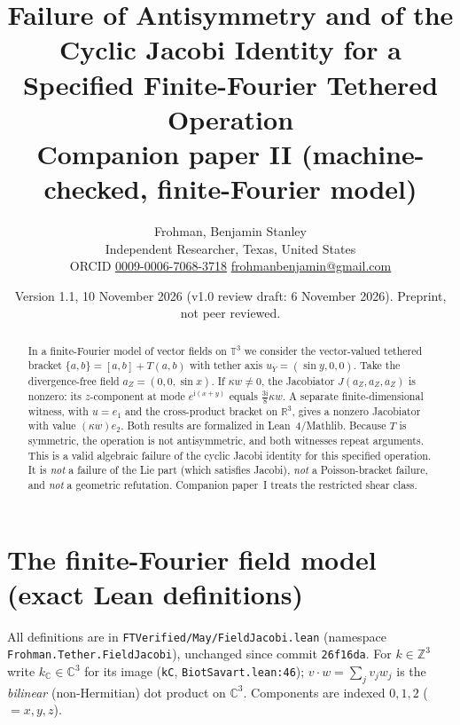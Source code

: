 \documentclass[11pt]{article}\emergencystretch=2em
\author{Frohman, Benjamin Stanley\\ \small Independent Researcher, Texas, United States\\ \small ORCID \href{https://orcid.org/0009-0006-7068-3718}{0009-0006-7068-3718} \quad \href{mailto:frohmanbenjamin@gmail.com}{frohmanbenjamin@gmail.com}}
\date{Version 1.1, 10 November 2026 (v1.0 review draft: 6 November 2026). Preprint, not peer reviewed.}
\title{Failure of Antisymmetry and of the Cyclic Jacobi Identity for a Specified Finite-Fourier Tethered Operation\\ \large Companion paper II (machine-checked, finite-Fourier model)}
\theoremstyle{definition}\newtheorem{definition}[theorem]{Definition}\theoremstyle{remark}\newtheorem{remark}[theorem]{Remark}
\newcommand{\ii}{\mathrm{i}}
\begin{document}
\maketitle
\begin{abstract}
In a finite-Fourier model of vector fields on $\mathbb T^3$ we consider the vector-valued tethered bracket $\{a,b\}=[a,b]+T(a,b)$ with tether axis $u_Y=(\sin y,0,0)$. Take the divergence-free field $a_Z=(0,0,\sin x)$. If $\kappa w\ne0$, the Jacobiator $J(a_Z,a_Z,a_Z)$ is nonzero: its $z$-component at mode $e^{\ii(x+y)}$ equals $\tfrac{3\ii}{8}\kappa w$. A separate finite-dimensional witness, with $u=e_1$ and the cross-product bracket on $\mathbb R^3$, gives a nonzero Jacobiator with value $(\kappa w)e_2$. Both results are formalized in Lean~4/Mathlib. Because $T$ is symmetric, the operation is not antisymmetric, and both witnesses repeat arguments. This is a valid algebraic failure of the cyclic Jacobi identity for this specified operation. It is \emph{not} a failure of the Lie part (which satisfies Jacobi), \emph{not} a Poisson-bracket failure, and \emph{not} a geometric refutation. Companion paper~I treats the restricted shear class.
\end{abstract}
\section{The finite-Fourier field model (exact Lean definitions)}
All definitions are in \nolinkurl{FTVerified/May/FieldJacobi.lean} (namespace\\ \texttt{Frohman.Tether.FieldJacobi}), unchanged since commit \texttt{26f16da}. For $k\in\mathbb Z^3$ write $k_{\mathbb C}\in\mathbb C^3$ for its image (\texttt{kC}, \texttt{BiotSavart.lean:46}); $v\cdot w=\sum_{j}v_jw_j$ is the \emph{bilinear} (non-Hermitian) dot product on $\mathbb C^3$. Components are indexed $0,1,2$ ($=x,y,z$).
\end{document}
